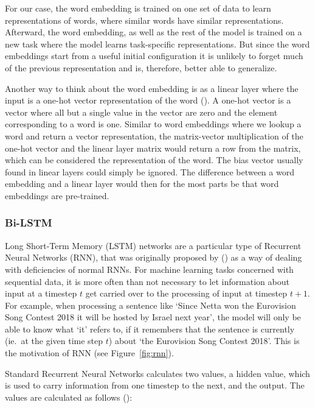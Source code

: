For our case, the word embedding is trained on one set of data to learn
representations of words, where similar words have similar representations.
Afterward, the word embedding, as well as the rest of the model is trained on a
new task where the model learns task-specific representations. But since the
word embeddings start from a useful initial configuration it is unlikely to
forget much of the previous representation and is, therefore, better able to
generalize.

Another way to think about the word embedding is as a linear layer where the
input is a one-hot vector representation of the word
(\cite[Chapter~4.8]{goldberg2017neural}).
A one-hot vector is a vector where all but a single value in the vector are zero
and the element corresponding to a word is one. Similar to word embeddings where
we lookup a word and return a vector representation, the matrix-vector
multiplication of the one-hot vector and the linear layer matrix would return a
row from the matrix, which can be considered the representation of the word. The
bias vector usually found in linear layers could simply be ignored. The
difference between a word embedding and a linear layer would then for the most
parts be that word embeddings are pre-trained.

\subsubsection{Bi-LSTM}\label{sec:setup-models-lstm}

Long Short-Term Memory (LSTM) networks are a particular type of Recurrent Neural
Networks (RNN), that was originally proposed by (\cite{hochreiter1997long}) as a
way of dealing with deficiencies of normal RNNs. For machine learning tasks
concerned with sequential data, it is more often than not necessary to let
information about input at a timestep $t$ get carried over to the processing
of input at timestep $t+1$. For example, when processing a sentence like
`Since Netta won the Eurovision Song Contest 2018 it will be hosted by Israel
next year', the model will only be able to know what `it' refers to, if it
remembers that the sentence is currently (ie.\ at the given time step $t$) about
`the Eurovision Song Contest 2018'. This is the motivation of RNN (see
Figure~\ref{fig:rnn}).

Standard Recurrent Neural Networks calculates two values, a hidden value, which
is used to carry information from one timestep to the next, and the output. The
values are calculated as follows (\cite[Chapter~10.2]{goodfellow2016deep}):

